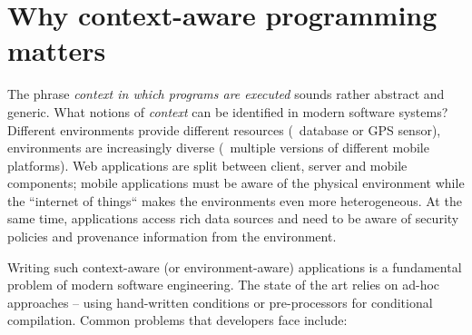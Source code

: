 
\section{Why context-aware programming matters}

The phrase \emph{context in which programs are executed} sounds rather abstract and generic.
What notions of \emph{context} can be identified in modern software systems?
Different environments provide different resources (\eg~database
or GPS sensor), environments are increasingly diverse (\eg~multiple versions of different
mobile platforms). Web applications are split between client, server and mobile components; mobile
applications must be aware of the physical environment while the ``internet
of things`` makes the environments even more heterogeneous. At the same time, applications access
rich data sources and need to be aware of security policies and provenance information from the
environment.

Writing such context-aware (or environment-aware) applications is a fundamental problem of modern 
software engineering. The state of the art relies on ad-hoc approaches -- using hand-written conditions 
or pre-processors for conditional compilation. Common problems that developers face include: 

